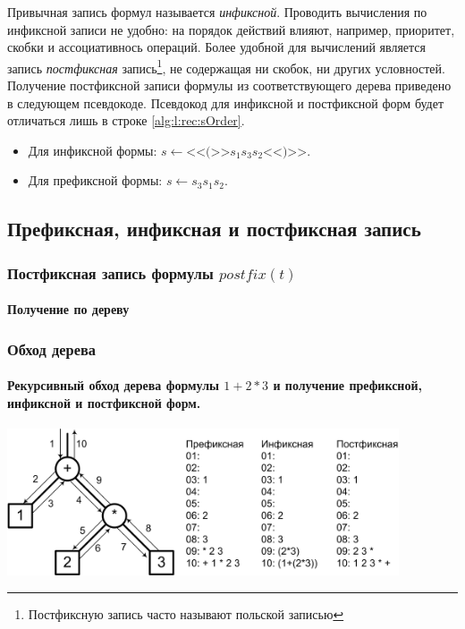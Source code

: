 Привычная запись формул называется \emph{инфиксной}. Проводить вычисления по инфиксной записи не удобно: на порядок действий влияют, например, приоритет, скобки и ассоциативнось операций. Более удобной для вычислений является запись \emph{постфиксная} запись\footnote{Постфиксную запись часто называют польской записью}, не содержащая ни скобок, ни других условностей. Получение постфиксной записи формулы из соответствующего дерева приведено в следующем псевдокоде. Псевдокод для инфиксной и постфиксной форм будет отличаться лишь в строке \ref{alg:l:rec:sOrder}.
\begin{itemize}
    \item Для инфиксной формы: $s\gets \text{<<(>>}s_1s_3s_2\text{<<)>>}$.
    \item Для префиксной формы: $s\gets s_3s_1s_2$.
\end{itemize}


\subsection{Префиксная, инфиксная и постфиксная запись}

\begin{frame}
    \frametitle{Постфиксная запись формулы $postfix(t)$}
    \framesubtitle{Получение по дереву}
    
    \begin{algorithmic}[1]

            \label{alg:l:rec:sOrder}
        \ENDIF
    \end{algorithmic}    
\end{frame}

\begin{frame}
    \frametitle{Обход дерева}
    \framesubtitle{Рекурсивный обход дерева формулы $1+2*3$ и получение префиксной, инфиксной и постфиксной форм.}

    \includegraphics[width=0.87\textwidth]{fig/XfixForms.png}
\end{frame}


